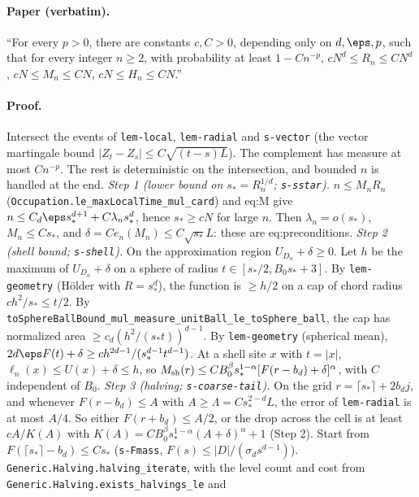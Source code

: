 \paragraph{Paper (verbatim).} ``For every $p>0$, there are constants $c,C>0$, depending only on
$d,\eps,p$, such that for every integer $n\geq2$, with probability at least $1-Cn^{-p}$,
$cN^d\leq R_n\leq CN^d$, $cN\leq M_n\leq CN$, $cN\leq H_n\leq CN$.''
\paragraph{Proof.} Intersect the events of \texttt{lem-local}, \texttt{lem-radial} and \texttt{s-vector}
(the vector martingale bound $|Z_t-Z_s|\le C\sqrt{(t-s)L}$). The complement has measure at most
$Cn^{-p}$. The rest is deterministic on the intersection, and bounded $n$ is handled at the end.
\emph{Step 1 (lower bound on $s_*=R_n^{1/d}$; \texttt{s-sstar}).} $n\le M_nR_n$
(\texttt{Occupation.le\_maxLocalTime\_mul\_card}) and eq:M give
$n\le C_d\eps s_*^{d+1}+C\lambda_ns_*^d$, hence $s_*\ge cN$ for large $n$. Then
$\lambda_n=o(s_*)$, $M_n\le Cs_*$, and $\delta=Ce_n(M_n)\le C\sqrt{s_*}L$: these are
eq:preconditions.
\emph{Step 2 (shell bound; \texttt{s-shell}).} On the approximation region $U_{D_n}+\delta\ge0$. Let
$h$ be the maximum of $U_{D_n}+\delta$ on a sphere of radius $t\in[s_*/2,B_0s_*+3]$. By
\texttt{lem-geometry} (H\"older with $R=s_*^d$), the function is $\ge h/2$ on a cap of chord radius
$ch^2/s_*\le t/2$. By \texttt{toSphereBallBound\_mul\_measure\_unitBall\_le\_toSphere\_ball}, the cap
has normalized area $\ge c_d(h^2/(s_*t))^{d-1}$. By \texttt{lem-geometry} (spherical mean),
$2d\eps F(t)+\delta\ge ch^{2d-1}/(s_*^{d-1}t^{d-1})$. At a shell site $x$ with $t=|x|$,
$\ell_n(x)\le U(x)+\delta\le h$, so $M_{\rm sh}(r)\le CB_0^\beta s_*^{1-\alpha}[F(r-b_d)+\delta]^\alpha$,
with $C$ independent of $B_0$.
\emph{Step 3 (halving; \texttt{s-coarse-tail}).} On the grid $r=\lceil s_*\rceil+2b_dj$, and whenever
$F(r-b_d)\le A$ with $A\ge\Lambda=Cs_*^{2-d}L$, the error of \texttt{lem-radial} is at most $A/4$.
So either $F(r+b_d)\le A/2$, or the drop across the cell is at least $cA/K(A)$ with
$K(A)=CB_0^\beta s_*^{1-\alpha}(A+\delta)^\alpha+1$ (Step 2). Start from $F(\lceil s_*\rceil-b_d)\le Cs_*$
(\texttt{s-Fmass}, $F(s)\le|D|/(\sigma_ds^{d-1})$). \texttt{Generic.Halving.halving\_iterate}, with the
level count and cost from \texttt{Generic.Halving.exists\_halvings\_le} and
